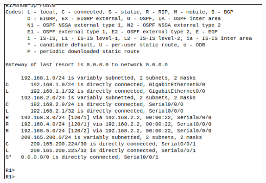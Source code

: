 \documentclass[../EngineeringJournal_CDavis.tex]{subfiles}
\begin{document}
\newpage



\begin{center}
  \includegraphics[scale=0.33]{Figures/2020-01-31-032604_545x371_scrot.png}
\end{center}
\end{document}
